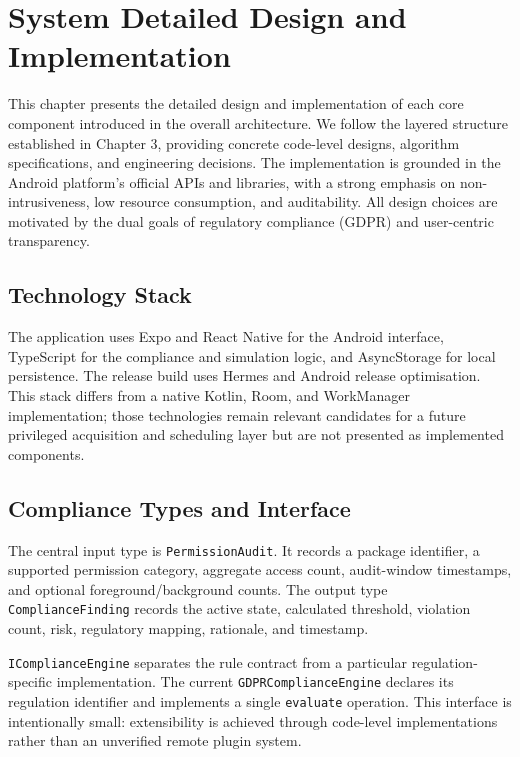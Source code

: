 \newpage
\section{System Detailed Design and Implementation}

This chapter presents the detailed design and implementation of each core component introduced in the overall architecture. We follow the layered structure established in Chapter 3, providing concrete code-level designs, algorithm specifications, and engineering decisions. The implementation is grounded in the Android platform's official APIs and libraries, with a strong emphasis on non-intrusiveness, low resource consumption, and auditability. All design choices are motivated by the dual goals of regulatory compliance (GDPR) and user-centric transparency.

\subsection{Technology Stack}

The application uses Expo and React Native for the Android interface, TypeScript for the compliance and simulation logic, and AsyncStorage for local persistence. The release build uses Hermes and Android release optimisation. This stack differs from a native Kotlin, Room, and WorkManager implementation; those technologies remain relevant candidates for a future privileged acquisition and scheduling layer but are not presented as implemented components.

\subsection{Compliance Types and Interface}

The central input type is \texttt{PermissionAudit}. It records a package identifier, a supported permission category, aggregate access count, audit-window timestamps, and optional foreground/background counts. The output type \texttt{ComplianceFinding} records the active state, calculated threshold, violation count, risk, regulatory mapping, rationale, and timestamp.

\texttt{IComplianceEngine} separates the rule contract from a particular regulation-specific implementation. The current \texttt{GDPRComplianceEngine} declares its regulation identifier and implements a single \texttt{evaluate} operation. This interface is intentionally small: extensibility is achieved through code-level implementations rather than an unverified remote plugin system.

